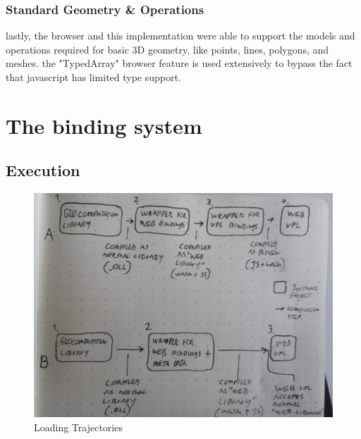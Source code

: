 \subsubsection*{Standard Geometry \& Operations}
lastly, the browser and this implementation were able to support the models and operations required for basic 3D geometry, like points, lines, polygons, and meshes.
the "TypedArray" browser feature is used extensively to bypass the fact that javascript has limited type support.


\newpage

\section{The binding system}
\label{sec:implementation:loading}

\subsection{Execution}

\begin{figure}
  \centering
  \graphicspath{ {../../assets/images/4/} }
  \includegraphics[width=\linewidth]{loading-trajectory.png}
  \caption[Loading Trajectory]{Loading Trajectories}
  \label{fig:loading-trajectory}
\end{figure}

